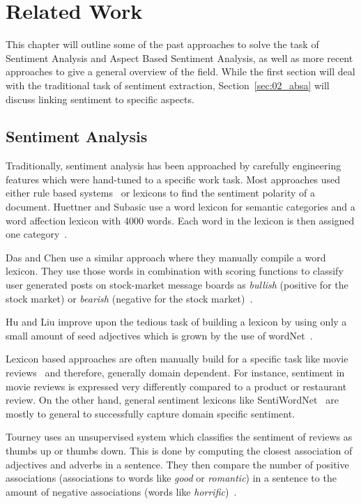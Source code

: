 \chapter{Related Work}
\label{ch:relWork}

This chapter will outline some of the past approaches to solve the task of Sentiment Analysis and Aspect Based Sentiment Analysis, as well as more recent approaches to give a general overview of the field. While the first section will deal with the traditional task of sentiment extraction, Section~\ref{sec:02_absa} will discuss linking sentiment to specific aspects.

\section{Sentiment Analysis}

Traditionally, sentiment analysis has been approached by carefully engineering features which were hand-tuned to a specific work task. Most approaches used either rule based systems~\cite{Popescu2005} or lexicons to find the sentiment polarity of a document. Huettner and Subasic use a word lexicon for semantic categories and a word affection lexicon with 4000 words. Each word in the lexicon is then assigned one category~\cite{Huettner2000}. 

Das and Chen use a similar approach where they manually compile a word lexicon. They use those words in combination with scoring functions to classify user generated posts on stock-market message boards as \textit{bullish} {(positive for the stock market)} or \textit{bearish} {(negative for the stock market)}~\cite{Das2007}.

Hu and Liu improve upon the tedious task of building a lexicon by using only a small amount of seed adjectives which is grown by the use of wordNet~\cite{Hu2004}.
\medskip

Lexicon based approaches are often manually build for a specific task like movie reviews~\cite{Tong2001, Thet2010} and therefore, generally domain dependent. For instance, sentiment in movie reviews is expressed very differently compared to a product or restaurant review. On the other hand, general sentiment lexicons like SentiWordNet~\cite{Baccianella2010} are mostly to general to successfully capture domain specific sentiment.
\medskip

Tourney uses an unsupervised system which classifies the sentiment of reviews as thumbs up or thumbs down. This is done by computing the closest association of adjectives and adverbs in a sentence. They then compare the number of positive associations {(associations to words like \textit{good} or \textit{romantic})} in a sentence to the amount of negative associations {(words like \textit{horrific})}~\cite{Turney2007}.
\medskip

